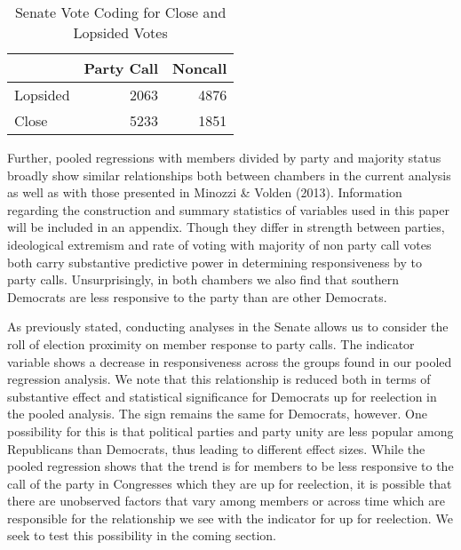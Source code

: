 \documentclass[12pt]{article}
\begin{document}
\begin{table}[H]
	\centering
	\caption{Senate Vote Coding for Close and Lopsided Votes} 
	\begin{tabular}{lrr}
		\hline
		& Party Call & Noncall \\ 
		\hline
		Lopsided & 2063 & 4876 \\ 
		Close & 5233 & 1851 \\ 
		\hline
	\end{tabular}
\end{table}

Further, pooled regressions with members divided by party and majority status broadly show similar relationships both between chambers in the current analysis as well as with those presented in Minozzi \& Volden (2013). Information regarding the construction and summary statistics of variables used in this paper will be included in an appendix. Though they differ in strength between parties, ideological extremism and rate of voting with majority of non party call votes both carry substantive predictive power in determining responsiveness by to party calls. Unsurprisingly, in both chambers we also find that southern Democrats are less responsive to the party than are other Democrats.

As previously stated, conducting analyses in the Senate allows us to consider the roll of election proximity on member response to party calls. The indicator variable shows a decrease in responsiveness across the groups found in our pooled regression analysis. We note that this relationship is reduced both in terms of substantive effect and statistical significance for Democrats up for reelection in the pooled analysis. The sign remains the same for Democrats, however. One possibility for this is that political parties and party unity are less popular among Republicans than Democrats, thus leading to different effect sizes. While the pooled regression shows that the trend is for members to be less responsive to the call of the party in Congresses which they are up for reelection, it is possible that there are unobserved factors that vary among members or across time which are responsible for the relationship we see with the indicator for up for reelection. We seek to test this possibility in the coming section.
\end{document}

